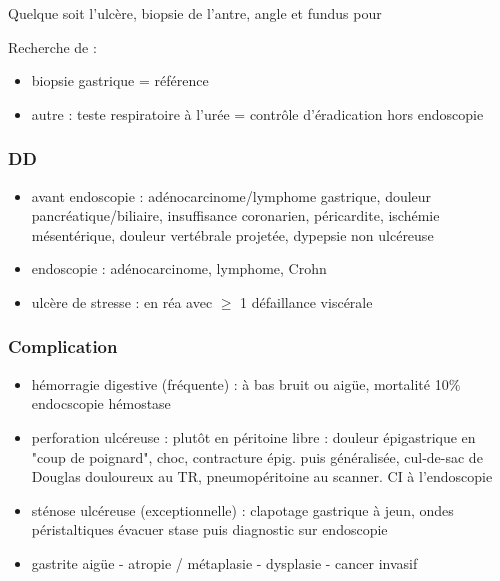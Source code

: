 \documentclass[11pt]{article}
\begin{document}
\begin{tcolorbox}
Quelque soit l'ulcère, biopsie de l'antre, angle et fundus pour 
\end{tcolorbox}

Recherche de  :
\begin{itemize}
\item biopsie gastrique = référence
\item autre : teste respiratoire à l'urée = contrôle d'éradication hors endoscopie
\end{itemize}


\subsubsection{DD}
\label{sec:orgb4ef521}
\begin{itemize}
\item avant endoscopie : adénocarcinome/lymphome gastrique, douleur
pancréatique/biliaire, insuffisance coronarien, péricardite, ischémie
mésentérique, douleur vertébrale projetée, dypepsie non ulcéreuse
\item endoscopie : adénocarcinome, lymphome, Crohn
\item ulcère de stresse : en réa avec \(\ge\) 1 défaillance viscérale
\end{itemize}

\subsubsection{Complication}
\label{sec:orgdaae5c4}
\begin{itemize}
\item hémorragie digestive (fréquente) : à bas bruit ou aigüe, mortalité 10\% \thus
endocscopie \textpm{} hémostase
\item perforation ulcéreuse : plutôt en péritoine libre : douleur épigastrique en "coup de
poignard", choc, contracture épig. puis généralisée, cul-de-sac de Douglas
douloureux au TR, pneumopéritoine au scanner. CI à l'endoscopie \danger
\item sténose ulcéreuse (exceptionnelle) : clapotage gastrique à jeun, ondes
péristaltiques \thus évacuer stase puis diagnostic sur endoscopie
\item gastrite aigüe - atropie / métaplasie - dysplasie - cancer invasif
\end{itemize}
\end{document}
